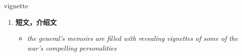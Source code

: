 
\begin{frame}
{\huge vignette}
\begin{center}
\begin{enumerate}\Large
  \item \textbf{短文，介绍文}
  \begin{itemize}
    \item \em{\Large{the general's memoirs are filled with revealing vignettes of some of the war's compelling personalities}}
  \end{itemize}
\end{enumerate}
\end{center}
\end{frame}
